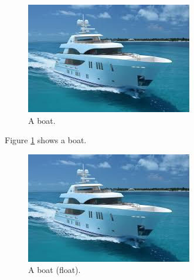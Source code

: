 \documentclass{article}
\begin{document}
\begin{figure}
    \includegraphics[width=\linewidth]{boat.jpg}
    \caption{A boat.}
    \label{fig:boat1}
\end{figure}

Figure \ref{fig:boat1} shows a boat.

\begin{figure}[h!]
    \includegraphics[width=\linewidth]{boat.jpg}
    \caption{A boat (float).}
    \label{fig:boat2}
\end{figure}
\end{document}
